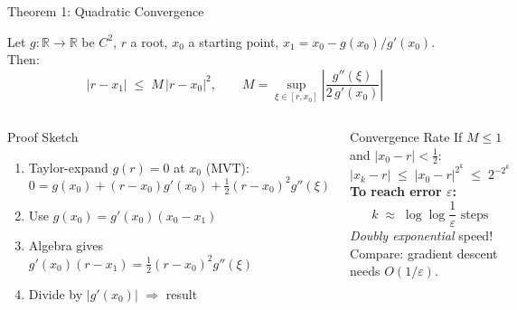 \documentclass[aspectratio=169,10pt]{beamer}
\newcommand{\R}{\mathbb{R}}
\begin{document}
\begin{frame}{Theorem 1: Quadratic Convergence}
  \begin{theorem}
    Let $g:\R\to\R$ be $C^2$, $r$ a root, $x_0$ a starting point,
    $x_1 = x_0 - g(x_0)/g'(x_0)$.  Then:
    \[
      |r - x_1| \;\le\; M\,|r-x_0|^2,
      \qquad
      M = \sup_{\xi\in[r,x_0]} \left|\frac{g''(\xi)}{2\,g'(x_0)}\right|
    \]
  \end{theorem}

  \begin{columns}[T]
      \begin{block}{Proof Sketch}
        \begin{enumerate}
          \item Taylor-expand $g(r)=0$ at $x_0$ (MVT):
          \[
            0 = g(x_0) + (r-x_0)g'(x_0) + \tfrac{1}{2}(r-x_0)^2 g''(\xi)
          \]
          \item Use $g(x_0)=g'(x_0)(x_0-x_1)$
          \item Algebra gives $g'(x_0)(r-x_1) = \tfrac{1}{2}(r-x_0)^2 g''(\xi)$
          \item Divide by $|g'(x_0)|$ $\Rightarrow$ result
        \end{enumerate}
      \end{block}

      \begin{exampleblock}{Convergence Rate}
        If $M\le 1$ and $|x_0-r|<\tfrac{1}{2}$:
        \[
          |x_k - r| \;\le\; |x_0-r|^{2^k} \;\le\; 2^{-2^k}
        \]
        \vspace{0.2em}
        \textbf{To reach error $\varepsilon$:}
        \[
          k \;\approx\; \log\log\frac{1}{\varepsilon} \text{ steps}
        \]
        \emph{Doubly exponential} speed!\\[0.3em]
        Compare: gradient descent needs $O(1/\varepsilon)$.
      \end{exampleblock}
  \end{columns}
\end{frame}
\end{document}
